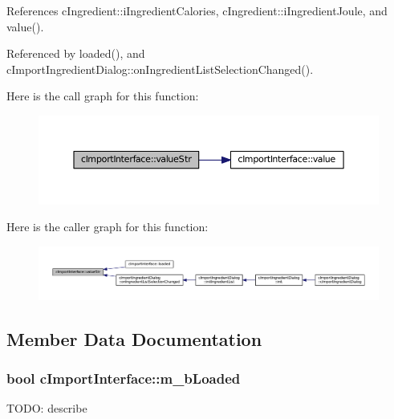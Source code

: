 References c\+Ingredient\+::i\+Ingredient\+Calories, c\+Ingredient\+::i\+Ingredient\+Joule, and value().



Referenced by loaded(), and c\+Import\+Ingredient\+Dialog\+::on\+Ingredient\+List\+Selection\+Changed().



Here is the call graph for this function\+:
\nopagebreak
\begin{figure}[H]
\begin{center}
\leavevmode
\includegraphics[width=350pt]{classc_import_interface_a272c43d684b605f36d36cb20e4039d94_cgraph}
\end{center}
\end{figure}




Here is the caller graph for this function\+:
\nopagebreak
\begin{figure}[H]
\begin{center}
\leavevmode
\includegraphics[width=350pt]{classc_import_interface_a272c43d684b605f36d36cb20e4039d94_icgraph}
\end{center}
\end{figure}




\subsection{Member Data Documentation}
\subsubsection[{\texorpdfstring{m\+\_\+b\+Loaded}{m_bLoaded}}]{\setlength{\rightskip}{0pt plus 5cm}bool c\+Import\+Interface\+::m\+\_\+b\+Loaded\hspace{0.3cm}{\ttfamily [protected]}}\hypertarget{classc_import_interface_ae58ec0e6b990aa6624a12af9dc20e8dc}{}\label{classc_import_interface_ae58ec0e6b990aa6624a12af9dc20e8dc}
T\+O\+DO\+: describe 

